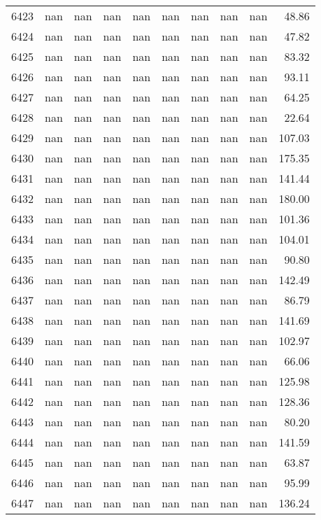 \begin{tabular}{lrrrrrrrrr}
6423 & nan & nan & nan & nan & nan & nan & nan & nan & 48.86 \\
6424 & nan & nan & nan & nan & nan & nan & nan & nan & 47.82 \\
6425 & nan & nan & nan & nan & nan & nan & nan & nan & 83.32 \\
6426 & nan & nan & nan & nan & nan & nan & nan & nan & 93.11 \\
6427 & nan & nan & nan & nan & nan & nan & nan & nan & 64.25 \\
6428 & nan & nan & nan & nan & nan & nan & nan & nan & 22.64 \\
6429 & nan & nan & nan & nan & nan & nan & nan & nan & 107.03 \\
6430 & nan & nan & nan & nan & nan & nan & nan & nan & 175.35 \\
6431 & nan & nan & nan & nan & nan & nan & nan & nan & 141.44 \\
6432 & nan & nan & nan & nan & nan & nan & nan & nan & 180.00 \\
6433 & nan & nan & nan & nan & nan & nan & nan & nan & 101.36 \\
6434 & nan & nan & nan & nan & nan & nan & nan & nan & 104.01 \\
6435 & nan & nan & nan & nan & nan & nan & nan & nan & 90.80 \\
6436 & nan & nan & nan & nan & nan & nan & nan & nan & 142.49 \\
6437 & nan & nan & nan & nan & nan & nan & nan & nan & 86.79 \\
6438 & nan & nan & nan & nan & nan & nan & nan & nan & 141.69 \\
6439 & nan & nan & nan & nan & nan & nan & nan & nan & 102.97 \\
6440 & nan & nan & nan & nan & nan & nan & nan & nan & 66.06 \\
6441 & nan & nan & nan & nan & nan & nan & nan & nan & 125.98 \\
6442 & nan & nan & nan & nan & nan & nan & nan & nan & 128.36 \\
6443 & nan & nan & nan & nan & nan & nan & nan & nan & 80.20 \\
6444 & nan & nan & nan & nan & nan & nan & nan & nan & 141.59 \\
6445 & nan & nan & nan & nan & nan & nan & nan & nan & 63.87 \\
6446 & nan & nan & nan & nan & nan & nan & nan & nan & 95.99 \\
6447 & nan & nan & nan & nan & nan & nan & nan & nan & 136.24 \\

\end{tabular}
